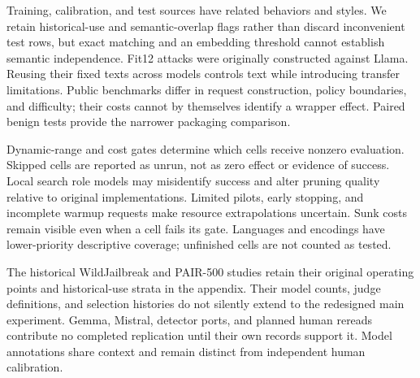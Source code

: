 Training, calibration, and test sources have related behaviors and styles. We retain historical-use and semantic-overlap flags rather than discard inconvenient test rows, but exact matching and an embedding threshold cannot establish semantic independence. Fit12 attacks were originally constructed against Llama. Reusing their fixed texts across models controls text while introducing transfer limitations. Public benchmarks differ in request construction, policy boundaries, and difficulty; their costs cannot by themselves identify a wrapper effect. Paired benign tests provide the narrower packaging comparison.

Dynamic-range and cost gates determine which cells receive nonzero evaluation. Skipped cells are reported as unrun, not as zero effect or evidence of success. Local search role models may misidentify success and alter pruning quality relative to original implementations. Limited pilots, early stopping, and incomplete warmup requests make resource extrapolations uncertain. Sunk costs remain visible even when a cell fails its gate. Languages and encodings have lower-priority descriptive coverage; unfinished cells are not counted as tested.

The historical WildJailbreak and PAIR-500 studies retain their original operating points and historical-use strata in the appendix. Their model counts, judge definitions, and selection histories do not silently extend to the redesigned main experiment. Gemma, Mistral, detector ports, and planned human rereads contribute no completed replication until their own records support it. Model annotations share context and remain distinct from independent human calibration.

